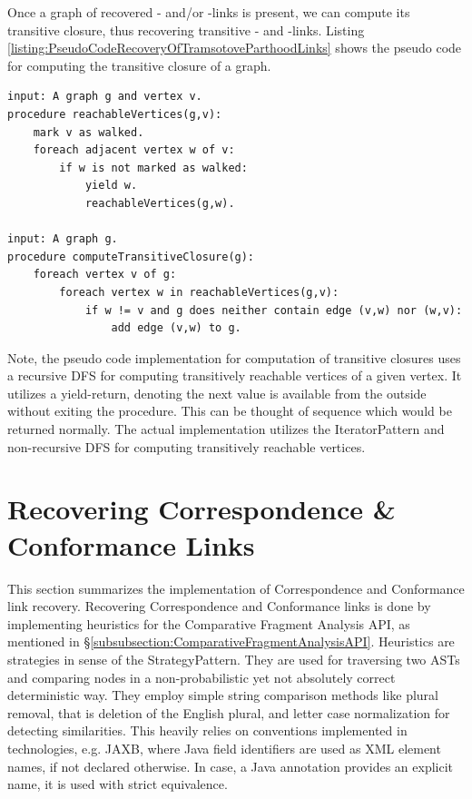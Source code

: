 Once a graph of recovered \partOf- and/or \fragmentOf-links is present, we can compute its transitive closure, thus recovering transitive \partOf- and \fragmentOf-links.
Listing \ref{listing:PseudoCodeRecoveryOfTramsotoveParthoodLinks} shows the pseudo code for computing the transitive closure of a graph.
\begin{lstlisting}[caption={Pseudo code Recovery of transitive Parthood Links},label={listing:PseudoCodeRecoveryOfTramsotoveParthoodLinks},morekeywords={procedure,foreach,input,output,if,yield}]
input: A graph g and vertex v.
procedure reachableVertices(g,v):
	mark v as walked.
	foreach adjacent vertex w of v:
		if w is not marked as walked:
			yield w.
			reachableVertices(g,w).
			
input: A graph g.
procedure computeTransitiveClosure(g):
	foreach vertex v of g:
		foreach vertex w in reachableVertices(g,v):
			if w != v and g does neither contain edge (v,w) nor (w,v):
				add edge (v,w) to g.
\end{lstlisting}
Note, the pseudo code implementation for computation of transitive closures uses a recursive \gls{DFS} for computing transitively reachable vertices of a given vertex.
It utilizes a yield-return, denoting the next value is available from the outside without exiting the procedure.
This can be thought of sequence which would be returned normally.
The actual implementation utilizes the \gls{IteratorPattern} and non-recursive \gls{DFS} for computing transitively reachable vertices. 

\section{Recovering Correspondence \& Conformance Links}
\label{section:RecoveringCorrespondenceAndConformanceLinks}
This section summarizes the implementation of \gls{Correspondence} and \gls{Conformance} link recovery.
Recovering  \gls{Correspondence} and \gls{Conformance} links is done by implementing heuristics for the Comparative Fragment Analysis \gls{API}, as mentioned in §\ref{subsubsection:ComparativeFragmentAnalysisAPI}.
Heuristics are strategies in sense of the \gls{StrategyPattern}.
They are used for traversing two \glspl{AST} and comparing nodes in a non-probabilistic yet not absolutely correct deterministic way.
They employ simple string comparison methods like plural removal, that is deletion of the English plural, and letter case normalization for detecting similarities.
This heavily relies on conventions implemented in technologies, e.g. \gls{JAXB}, where \gls{Java} field identifiers are used as \gls{XML} element names, if not declared otherwise.
In case, a \gls{Java} annotation provides an explicit name, it is used with strict equivalence.

